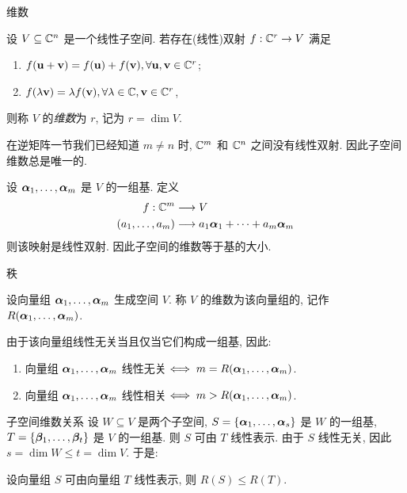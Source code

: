 \begin{frame}{维数}
	\onslide<+->
	\begin{definition}
		设 $V\subseteq {\mathbb{C}}^n$ 是一个线性子空间.
		若存在(线性)双射 $f:{\mathbb{C}}^r\to V$ 满足
		\begin{enumerate}[<*>]
			\item $f({\mathbf{u}}+{\mathbf{v}})=f({\mathbf{u}})+f({\mathbf{v}}),\forall {\mathbf{u}},{\mathbf{v}}\in{\mathbb{C}}^r$;
			\item $f(\lambda{\mathbf{v}})=\lambda f({\mathbf{v}}),\forall \lambda\in{\mathbb{C}},{\mathbf{v}}\in{\mathbb{C}}^r$,
		\end{enumerate}
		则称 $V$ 的\emph{维数}为 $r$, 记为 $r=\dim V$.
	\end{definition}
	\onslide<+->
	在逆矩阵一节我们已经知道 $m\neq n$ 时, ${\mathbb{C}}^m$ 和 ${\mathbb{C}}^n$ 之间没有线性双射.
	\onslide<+->
	因此子空间维数总是唯一的.

	\onslide<+->
	设 ${\boldsymbol{\alpha}}_1,\dots,{\boldsymbol{\alpha}}_m$ 是 $V$ 的一组基.
	\onslide<+->
	定义
	\begin{align*}
		f:{\mathbb{C}}^m&\longrightarrow V\\
		(a_1,\dots,a_m)&\longrightarrow a_1{\boldsymbol{\alpha}}_1+\cdots+a_m{\boldsymbol{\alpha}}_m
	\end{align*}
	\onslide<+->
	则该映射是线性双射.
	\onslide<+->
	因此子空间的\alert{维数等于基的大小}.
\end{frame}


\begin{frame}{秩}
	\onslide<+->
	\begin{definition}
		设向量组 ${\boldsymbol{\alpha}}_1,\dots,{\boldsymbol{\alpha}}_m$ 生成空间 $V$.
		称 $V$ 的维数为该向量组的\emph{}, 记作 $R({\boldsymbol{\alpha}}_1,\dots,{\boldsymbol{\alpha}}_m)$.
	\end{definition}
	\onslide<+->
	由于该向量组线性无关当且仅当它们构成一组基,
	\onslide<+->
	因此:
	\begin{theorem}
		\begin{enumerate}
			\item 向量组 ${\boldsymbol{\alpha}}_1,\dots,{\boldsymbol{\alpha}}_m$ 线性无关$\iff m=R({\boldsymbol{\alpha}}_1,\dots,{\boldsymbol{\alpha}}_m)$.
			\item 向量组 ${\boldsymbol{\alpha}}_1,\dots,{\boldsymbol{\alpha}}_m$ 线性相关$\iff m>R({\boldsymbol{\alpha}}_1,\dots,{\boldsymbol{\alpha}}_m)$.
		\end{enumerate}
	\end{theorem}
\end{frame}


\begin{frame}{子空间维数关系}
	\onslide<+->
	设 $W\subseteq V$ 是两个子空间, $S=\{{\boldsymbol{\alpha}}_1,\dots,{\boldsymbol{\alpha}}_s\}$ 是 $W$ 的一组基, $T=\{{\boldsymbol{\beta}}_1,\dots,{\boldsymbol{\beta}}_t\}$ 是 $V$ 的一组基.
	\onslide<+->
	则 $S$ 可由 $T$ 线性表示.
	\onslide<+->
	由于 $S$ 线性无关, 因此 $s=\dim W\le t=\dim V$.
	\onslide<+->
	于是:
	\begin{theorem}
		设向量组 $S$ 可由向量组 $T$ 线性表示, 则 $R(S)\le R(T)$.
	\end{theorem}
\end{frame}


